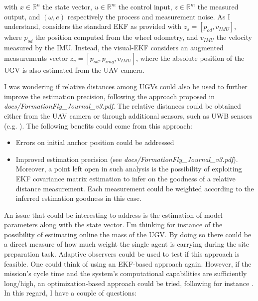 with $x\in\mathbb{R}^n$ the state vector, $u\in\mathbb{R}^m$ the control input, $z\in\mathbb{R}^m$ the measured output, and $(\omega,e)$ respectively the process and measurement noise. As I understand, \cite{Oren2022} considers the standard EKF as provided with $z_{s} = [p_{od}, v_{IMU}]$, where $p_{od}$ the position computed from the wheel odometry, and $v_{IMU}$ the velocity measured by the IMU. Instead, the visual-EKF considers an augmented measurements vector $z_v = [p_{od}, p_{img},v_{IMU}]$, where the absolute position of the UGV is also estimated from the UAV camera. 

\medskip
I was wondering if relative distances among UGVs could also be used to further improve the estimation precision, following the approach proposed in \textit{docs/FormationFly\_Journal\_v3.pdf}. The relative distances could be obtained either from the UAV camera or through additional sensors, such as UWB sensors (e.g. \cite{UWBmodules,UWBdecawave}). The following benefits could come from this approach: 

\begin{itemize}
    \item Errors on initial anchor position could be addressed 
    \item Improved estimation precision (see \textit{docs/FormationFly\_Journal\_v3.pdf}). Moreover, a point left open in such analysis is the possibility of exploiting EKF covariance matrix estimation to infer on the goodness of a relative distance measurement. Each measurement could be weighted according to the inferred estimation goodness in this case. 
\end{itemize}

\newline
An issue that could be interesting to address is the estimation of model parameters along with the state vector. I'm thinking for instance of the possibility of estimating online the mass of the UGV. By doing so there could be a direct measure of how much weight the single agent is carrying during the site preparation task. Adaptive observers could be used to test if this approach is feasible. One could think of using an EKF-based approach again. However, if the mission's cycle time and the system's computational capabilities are sufficiently long/high, an optimization-based approach could be tried, following for instance \cite{Oliva01,Oliva02}. In this regard, I have a couple of questions: 

